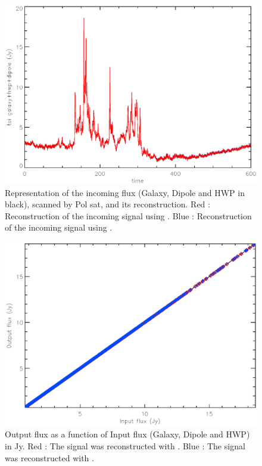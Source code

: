 \begin{figure}[h]
\center
	\includegraphics[scale=0.5]{Figures/toi-galaxy-hwp-dipole.eps}
	\caption{Representation of the incoming flux (Galaxy, Dipole and HWP in black), scanned by Pol sat, and its reconstruction. Red : Reconstruction of the incoming signal using \cf. Blue : Reconstruction of the incoming signal using \rf. }
	\label{fig:toi-galaxy-hwp-dipole-pol}
\end{figure}

\begin{figure}[h]
\center
	\includegraphics[scale=0.5]{Figures/NL-galaxy-hwp-dipole.eps}
	\caption{Output flux as a function of Input flux (Galaxy, Dipole and HWP) in Jy. Red : The signal was reconstructed with \cf. Blue : The signal was reconstructed with \rf.}
	\label{fig:nl-galaxy-hwp-dipole-pol}
\end{figure}

